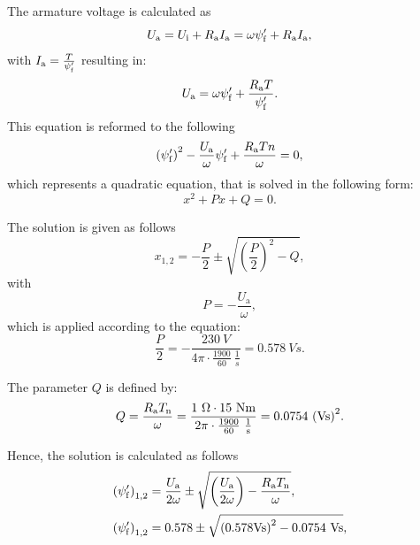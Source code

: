 \begin{solutionblock}
	The armature voltage is calculated as
	\begin{equation}
		\Ua = \Ui + \Ra \Ia
		= \omega \psi_{\mathrm{f}}' + \Ra I_{\mathrm{a}},
	\end{equation}
	with $\Ia = \frac{T}{\psi_{\mathrm{f}}'}$ resulting in:
	\begin{equation}
		\Ua = \omega \psi_{\mathrm{f}}' + \frac{\Ra T}{\psi_{\mathrm{f}}'}.
	\end{equation}
	This equation is reformed to the following
	\begin{equation}
		\left(\psi_{\mathrm{f}}' \right)^2 - \frac{U_{\mathrm{a}}}{\omega} \psi_{\mathrm{f}}' + \frac{\Ra Tn}{\omega} = 0,
	\end{equation}
	which represents a quadratic equation, that is solved in the following form:
	\begin{equation}
		x^2 + P x + Q = 0.
	\end{equation}

	The solution is given as follows
	\begin{equation}
		x_{\mathrm{1,2}} = -\frac{P}{2} \pm \sqrt{\left(\frac{P}{2}\right)^2 - Q},
	\end{equation}
	with
	\begin{equation}
		P = -\frac{U_{\mathrm{a}}}{\omega},
	\end{equation}
	which is applied according to the equation:
	\begin{equation}
		\frac{P}{2} = - \frac{230 \ \si{V}}{4 \pi \cdot \frac{1900}{60} \ \si{\frac{1}{s}}}
		= 0.578 \ \si{Vs}.
	\end{equation}

	The parameter $Q$ is defined by:
	\begin{equation}
		Q = \frac{\Ra \Tn}{\omega}
		= \frac{1 \ \si{\Omega} \cdot 15 \ \si{Nm}}{2 \pi \cdot \frac{1900}{60} \ \si{\frac{1}{s}}}
		= 0.0754 \ \si{(Vs)^2}.
	\end{equation}

	Hence, the solution is calculated as follows
	\begin{align}
		\begin{split}
			\left(\psi_{\mathrm{f}}' \right)_{\mathrm{1,2}}
			 & = \frac{U_{\mathrm{a}}}{2 \omega} \pm \sqrt{\left( \frac{U_{\mathrm{a}}}{2 \omega}\right) - \frac{\Ra \Tn}{\omega}}, \\
			\left(\psi_{\mathrm{f}}' \right)_{\mathrm{1,2}}
			 & = 0.578 \pm \sqrt{\left(0.578 \si{Vs} \right)^2 - 0.0754 \ \si{Vs}},
		\end{split}
	\end{align}


\end{solutionblock}
